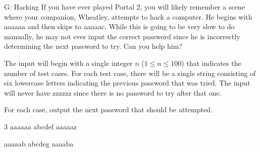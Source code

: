 \begin{problem}{G: Hacking}
If you have ever played Portal 2, you will likely remember a scene where your companion, Wheatley, attempts to hack a computer. He begins with aaaaaa and then skips to aaaaac. While this is going to be very slow to do manually, he may not ever input the correct password since he is incorrectly determining the next password to try. Can you help him?
\end{problem}

\begin{formalin}
The input will begin with a single integer $n$ ($1 \leq n \leq 100$) that indicates the number of test cases. For each test case, there will be a single string consisting of six lowercase letters indicating the previous password that was tried. The input will never have zzzzzz since there is no password to try after that one.
\end{formalin}

\begin{formalout}
For each case, output the next password that should be attempted.
\end{formalout}

\begin{datain}
3
aaaaaa
abcdef
aaaaaz
\end{datain}

\begin{dataout}
aaaaab
abcdeg
aaaaba
\end{dataout}

